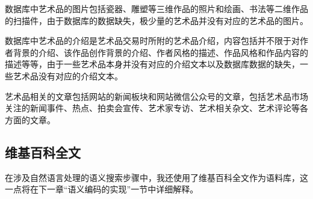 数据库中艺术品的图片包括瓷器、雕塑等三维作品的照片和绘画、书法等二维作品的扫描件，由于数据库的数据缺失，极少量的艺术品并没有对应的艺术品的图片。

数据库中艺术品的介绍是艺术品交易时所附的艺术品介绍，内容包括并不限于对作者背景的介绍、该作品创作背景的介绍、作者风格的描述、作品风格和作品内容的描述等等，由于一些艺术品本身并没有对应的介绍文本以及数据库数据的缺失，一些艺术品没有对应的介绍文本。

艺术品相关的文章包括网站的新闻板块和网站微信公众号的文章，包括艺术品市场关注的新闻事件、热点、拍卖会宣传、艺术家专访、艺术相关杂文、艺术评论等各方面的文章。

\subsection{维基百科全文}
在涉及自然语言处理的语义搜索步骤中，我还使用了维基百科全文作为语料库，这一点将在下一章“语义编码的实现”一节中详细解释。




